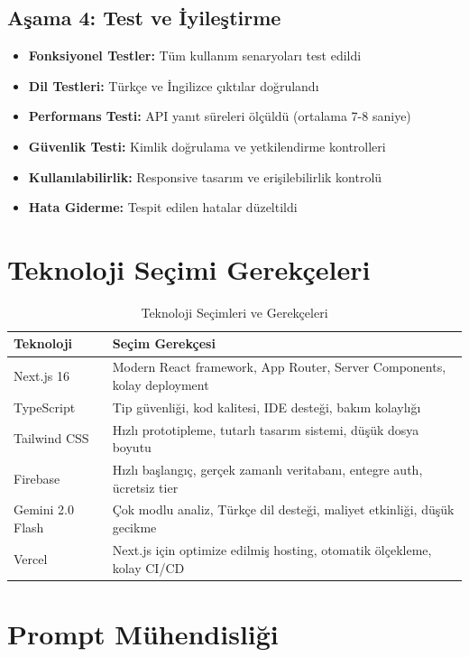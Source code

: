 \subsection{Aşama 4: Test ve İyileştirme}

\begin{itemize}
  \item \textbf{Fonksiyonel Testler:} Tüm kullanım senaryoları test edildi
  \item \textbf{Dil Testleri:} Türkçe ve İngilizce çıktılar doğrulandı
  \item \textbf{Performans Testi:} API yanıt süreleri ölçüldü (ortalama 7-8 saniye)
  \item \textbf{Güvenlik Testi:} Kimlik doğrulama ve yetkilendirme kontrolleri
  \item \textbf{Kullanılabilirlik:} Responsive tasarım ve erişilebilirlik kontrolü
  \item \textbf{Hata Giderme:} Tespit edilen hatalar düzeltildi
\end{itemize}

\section{Teknoloji Seçimi Gerekçeleri}

\begin{table}[H]
\centering
\caption{Teknoloji Seçimleri ve Gerekçeleri}
\label{tab:teknolojisecim}
\begin{tabular}{p{3cm}p{10cm}}
\toprule
\textbf{Teknoloji} & \textbf{Seçim Gerekçesi} \\
\midrule
Next.js 16 & Modern React framework, App Router, Server Components, kolay deployment \\
TypeScript & Tip güvenliği, kod kalitesi, IDE desteği, bakım kolaylığı \\
Tailwind CSS & Hızlı prototipleme, tutarlı tasarım sistemi, düşük dosya boyutu \\
Firebase & Hızlı başlangıç, gerçek zamanlı veritabanı, entegre auth, ücretsiz tier \\
Gemini 2.0 Flash & Çok modlu analiz, Türkçe dil desteği, maliyet etkinliği, düşük gecikme \\
Vercel & Next.js için optimize edilmiş hosting, otomatik ölçekleme, kolay CI/CD \\
\bottomrule
\end{tabular}
\end{table}

\section{Prompt Mühendisliği}

